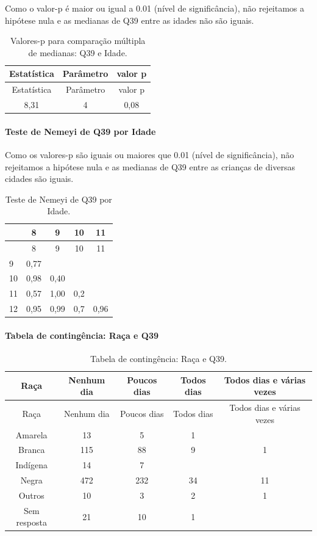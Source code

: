 \documentclass[]{article}
\let\oldparagraph\paragraph
\renewcommand{\paragraph}[1]{\oldparagraph{#1}\mbox{}}
\begin{document}
Como o valor-p é maior ou igual a 0.01 (nível de significância), não rejeitamos a hipótese nula e as medianas de Q39 entre as idades não são iguais.

\begin{longtable}[]{@{}ccc@{}}
\caption{\label{tab:unnamed-chunk-1514}Valores-p para comparação múltipla de medianas: Q39 e Idade.}\tabularnewline
\toprule
Estatística & Parâmetro & valor p\tabularnewline
\midrule
\endfirsthead
\toprule
Estatística & Parâmetro & valor p\tabularnewline
\midrule
\endhead
8,31 & 4 & 0,08\tabularnewline
\bottomrule
\end{longtable}

\hypertarget{teste-de-nemeyi-de-q39-por-idade}{%
\paragraph{Teste de Nemeyi de Q39 por Idade}\label{teste-de-nemeyi-de-q39-por-idade}}

Como os valores-p são iguais ou maiores que 0.01 (nível de significância), não rejeitamos a hipótese nula e as medianas de Q39 entre as crianças de diversas cidades são iguais.

\begin{longtable}[]{@{}lcccc@{}}
\caption{\label{tab:unnamed-chunk-1516}Teste de Nemeyi de Q39 por Idade.}\tabularnewline
\toprule
& 8 & 9 & 10 & 11\tabularnewline
\midrule
\endfirsthead
\toprule
& 8 & 9 & 10 & 11\tabularnewline
\midrule
\endhead
9 & 0,77 & & &\tabularnewline
10 & 0,98 & 0,40 & &\tabularnewline
11 & 0,57 & 1,00 & 0,2 &\tabularnewline
12 & 0,95 & 0,99 & 0,7 & 0,96\tabularnewline
\bottomrule
\end{longtable}

\cleardoublepage

\hypertarget{tabela-de-continguxeancia-rauxe7a-e-q39}{%
\paragraph{Tabela de contingência: Raça e Q39}\label{tabela-de-continguxeancia-rauxe7a-e-q39}}

\begin{longtable}[]{@{}ccccc@{}}
\caption{\label{tab:unnamed-chunk-1517}Tabela de contingência: Raça e Q39.}\tabularnewline
\toprule
Raça & Nenhum dia & Poucos dias & Todos dias & Todos dias e várias vezes\tabularnewline
\midrule
\endfirsthead
\toprule
Raça & Nenhum dia & Poucos dias & Todos dias & Todos dias e várias vezes\tabularnewline
\midrule
\endhead
Amarela & 13 & 5 & 1 &\tabularnewline
Branca & 115 & 88 & 9 & 1\tabularnewline
Indígena & 14 & 7 & &\tabularnewline
Negra & 472 & 232 & 34 & 11\tabularnewline
Outros & 10 & 3 & 2 & 1\tabularnewline
Sem resposta & 21 & 10 & 1 &\tabularnewline
\bottomrule
\end{longtable}
\end{document}
